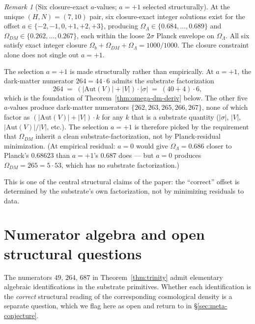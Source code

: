 \documentclass[11pt,reqno]{amsart}
\theoremstyle{plain}
\theoremstyle{definition}
\theoremstyle{remark}
\newtheorem*{remark}{Remark}
\newcommand{\Aut}{\mathrm{Aut}}
\begin{document}
\begin{remark}[Six closure-exact $a$-values; $a = +1$ selected structurally]\label{rem:a-selection}
At the unique $(H, N) = (7, 10)$ pair, six closure-exact integer
solutions exist for the offset $a \in \{-2, -1, 0, +1, +2, +3\}$,
producing $\Omega_\Lambda \in \{0.684, \ldots, 0.689\}$ and
$\Omega_{DM} \in \{0.262, \ldots, 0.267\}$, each within the loose
$2\sigma$ Planck envelope on $\Omega_\Lambda$. All six satisfy
exact integer closure $\Omega_b + \Omega_{DM} + \Omega_\Lambda = 1000/1000$.
The closure constraint alone does not single out $a = +1$.

The selection $a = +1$ is made structurally rather than empirically.
At $a = +1$, the dark-matter numerator $264 = 44 \cdot 6$ admits the
substrate factorization
\[
  264 \;=\; (|\Aut(V)| + |V|) \cdot |\sigma| \;=\; (40 + 4) \cdot 6,
\]
which is the foundation of Theorem~\ref{thm:omega-dm-deriv} below.
The other five $a$-values produce dark-matter numerators
$\{262, 263, 265, 266, 267\}$, none of which factor as
$(|\Aut(V)| + |V|) \cdot k$ for any $k$ that is a substrate
quantity ($|\sigma|$, $|V|$, $|\Aut(V)|/|V|$, etc.). The
selection $a = +1$ is therefore picked by the requirement that
$\Omega_{DM}$ inherit a clean substrate-factorization, not by
Planck-residual minimization. (At empirical residual:
$a = 0$ would give $\Omega_\Lambda = 0.686$ closer to Planck's
$0.68623$ than $a = +1$'s $0.687$ does --- but $a = 0$ produces
$\Omega_{DM} = 265 = 5 \cdot 53$, which has no substrate
factorization.)

This is one of the central structural claims of the paper: the
``correct'' offset is determined by the substrate's own
factorization, not by minimizing residuals to data.
\end{remark}

\section{Numerator algebra and open structural questions}\label{sec:derivations}

The numerators $49$, $264$, $687$ in
Theorem~\ref{thm:trinity} admit elementary algebraic identifications
in the substrate primitives. Whether each identification is the
\emph{correct} structural reading of the corresponding cosmological
density is a separate question, which we flag here as open and
return to in \S\ref{sec:meta-conjecture}.
\end{document}
